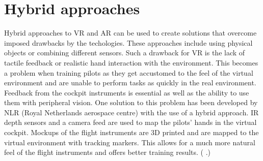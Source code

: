 \documentclass[12pt, a4paper,oneside, nocenter]{thesis}
\renewcommand{\citep}[1]{(\citeauthor{#1} \citeyear{#1}.)}
\begin{document}
\section{Hybrid approaches}
\par
Hybrid approaches to VR and AR can be used to create solutions that overcome imposed drawbacks by the techologies. These approaches include using physical objects or combining different sensors.
Such a drawback for VR is the lack of tactile feedback or realistic hand interaction with the environment. This becomes a problem when training pilots as they get accustomed to the feel of the virtual environment and are unable to perform tasks as quickly in the real environment.
Feedback from the cockpit instruments is essential as well as the ability to use them with peripheral vision.
One solution to this problem has been developed by NLR (Royal Netherlands aerospace centre) with the use of a hybrid approach.
IR depth sensors and a camera feed are used to map the pilots' hands in the virtual cockpit. Mockups of the flight instruments are 3D printed and are mapped to the virtual environment with tracking markers. This allows for a much more natural feel of the flight instruments and offers better training results. \citep{nlr-vr}
\\
\end{document}
